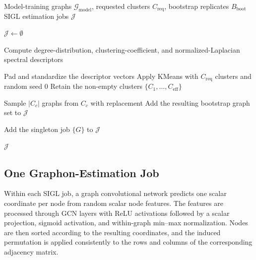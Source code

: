 \begin{algorithm}[H]
    \caption{Construction of SIGL graphon-estimation jobs}
    \label{alg:sigl_job_construction}
    \begin{algorithmic}[1]
    
    \Require Model-training graphs $\mathcal{G}_{\mathrm{model}}$,
             requested clusters $C_{\mathrm{req}}$,
             bootstrap replicates $B_{\mathrm{boot}}$
    \Ensure SIGL estimation jobs $\mathcal{J}$
    
    \State $\mathcal{J} \gets \emptyset$
    
            \State Compute degree-distribution, clustering-coefficient,
            and normalized-Laplacian spectral descriptors
        \EndFor
    
        \State Pad and standardize the descriptor vectors
        \State Apply KMeans with $C_{\mathrm{req}}$ clusters and random seed $0$
        \State Retain the non-empty clusters
        $\{C_1,\ldots,C_{\mathrm{eff}}\}$
    
                \State Sample $|C_c|$ graphs from $C_c$ with replacement
                \State Add the resulting bootstrap graph set to $\mathcal{J}$
            \EndFor
        \EndFor
    
    \Else
            \State Add the singleton job $\{G\}$ to $\mathcal{J}$
        \EndFor
    \EndIf
    
    \State \Return $\mathcal{J}$
    
    \end{algorithmic}
\end{algorithm}

\subsection{One Graphon-Estimation Job}
\label{subsec:method_sigl_job}

Within each SIGL job, a graph convolutional network predicts one scalar coordinate per node from random scalar node features. The features are processed through GCN layers with ReLU activations followed by a scalar projection, sigmoid activation, and within-graph min--max normalization. Nodes are then sorted according to the resulting coordinates, and the induced permutation is applied consistently to the rows and columns of the corresponding adjacency matrix.

